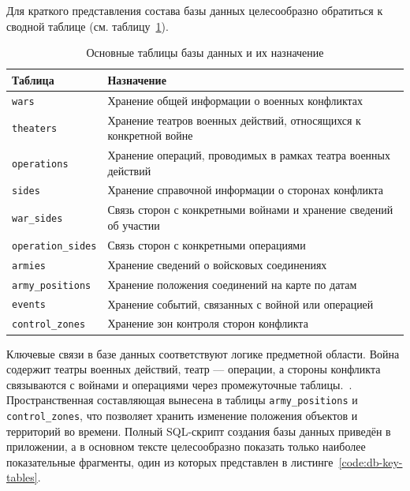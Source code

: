 Для краткого представления состава базы данных целесообразно обратиться к сводной таблице (см. таблицу~\ref{tab:db-main-tables}).

\begin{table}[H]
\caption{\label{tab:db-main-tables}Основные таблицы базы данных и их назначение}
\centering
\small
\begin{tabular}{|p{2.8cm}|p{12.2cm}|}
\hline
Таблица & Назначение \\
\hline
\texttt{wars} & Хранение общей информации о военных конфликтах \\
\hline
\texttt{theaters} & Хранение театров военных действий, относящихся к конкретной войне \\
\hline
\texttt{operations} & Хранение операций, проводимых в рамках театра военных действий \\
\hline
\texttt{sides} & Хранение справочной информации о сторонах конфликта \\
\hline
\texttt{war\_sides} & Связь сторон с конкретными войнами и хранение сведений об участии \\
\hline
\texttt{operation\_sides} & Связь сторон с конкретными операциями \\
\hline
\texttt{armies} & Хранение сведений о войсковых соединениях \\
\hline
\texttt{army\_positions} & Хранение положения соединений на карте по датам \\
\hline
\texttt{events} & Хранение событий, связанных с войной или операцией \\
\hline
\texttt{control\_zones} & Хранение зон контроля сторон конфликта \\
\hline
\end{tabular}
\end{table}

Ключевые связи в базе данных соответствуют логике предметной области. Война содержит театры военных действий, театр --- операции, а стороны конфликта связываются с войнами и операциями через промежуточные таблицы.~\cite{silberschatz2019database}.
Пространственная составляющая вынесена в таблицы \texttt{army\_positions} и \texttt{control\_zones}, что позволяет хранить изменение положения объектов и территорий во времени. 
Полный SQL-скрипт создания базы данных приведён в приложении, а в основном тексте целесообразно показать только наиболее показательные фрагменты, один из которых представлен в листинге~\ref{code:db-key-tables}.

